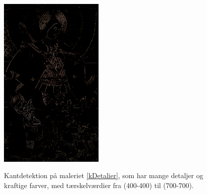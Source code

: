 \begin{figure}[!h]
{        \includegraphics[angle=0,width=0.45\textwidth]{afsnit/afprovning/billeder/thressholds/krafitige_farver/krafite_detalier/1_iteration/600-600.png}
        \label{600-600}}
    \caption{Kantdetektion på maleriet \ref{kDetalier}, som har mange
	detaljer og kraftige farver, med tærskelværdier fra (400-400) til
	(700-700).}
     \label{allesammen2}
\end{figure}

